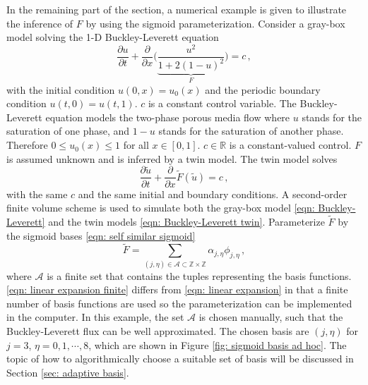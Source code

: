 In the remaining part of the section, a numerical example is given to illustrate the inference
of $F$ by using the sigmoid parameterization.
Consider a gray-box model solving the 1-D Buckley-Leverett equation
\cite{Buckley Leverett}
\begin{equation}
    \frac{\partial u}{\partial t} + \frac{\partial}{\partial x}\Big(\underbrace{
    \frac{u^2}{1+ 2(1-u)^2}}_{F} \Big) = c\,,
    \label{eqn: Buckley-Leverett}
\end{equation}
with the initial condition $u(0,x)=u_0(x)$ and the periodic boundary condition $u(t,0)=u(t,1)$. 
$c$ is a constant control variable.
The Buckley-Leverett equation models the two-phase porous media flow where $u$ stands for the
saturation of one phase, and $1-u$ stands for the saturation of another phase. 
Therefore $0 \le u_0(x) \le 1$ for all $x\in [0,1]$. 
$c\in \mathbb{R}$ is a constant-valued control. $F$ is assumed unknown and is inferred by a twin model.
The twin model solves 
\begin{equation}
    \frac{\partial \tilde{u}}{\partial t} + \frac{\partial}{\partial x}\tilde{F}(\tilde{u})
    = c\,,
    \label{eqn: Buckley-Leverett twin}
\end{equation}
with the same $c$ and the same initial and boundary conditions. 
A second-order finite volume scheme is used to simulate both the gray-box model
\eqref{eqn: Buckley-Leverett} and the twin models \eqref{eqn: Buckley-Leverett twin}.
Parameterize $\tilde{F}$ by
the sigmoid bases \eqref{eqn: self similar sigmoid}
\begin{equation}
    \tilde{F} = \sum_{(j, \eta)\in \mathcal{A}\subset \mathbb{Z}\times \mathbb{Z}} 
                       \alpha_{{j}, {\eta}}
                       \phi_{{j}, {\eta}}\,,
    \label{eqn: linear expansion finite}
\end{equation}
where $\mathcal{A}$ is a finite set that contains the tuples representing
the basis functions. \eqref{eqn: linear expansion finite} differs from 
\eqref{eqn: linear expansion} in that a finite number of basis functions are used so
the parameterization can be implemented in the computer. In this example, the set $\mathcal{A}$
is chosen manually, such that the Buckley-Leverett flux can be well approximated.
The chosen basis are $(j, \eta)$ for $j=3$, $\eta=0,1,\cdots, 8$, which are shown in 
Figure \ref{fig: sigmoid basis ad hoc}.
The topic of
how to algorithmically choose a suitable set of basis will be discussed 
in Section \ref{sec: adaptive basis}.\\
